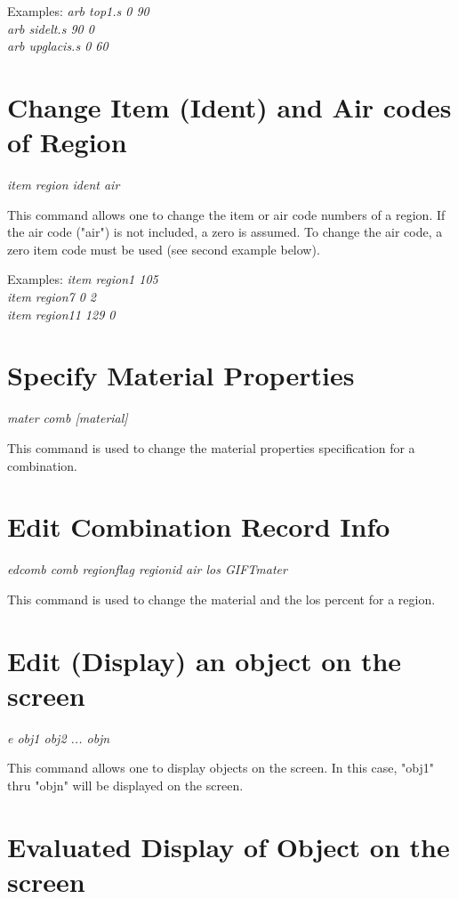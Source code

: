 Examples:
{\em
           arb top1.s 0 90 \\
           arb sidelt.s 90 0 \\
           arb upglacis.s 0 60 \\
}

\section{Change Item (Ident) and Air codes of Region}

{\em \center
item region ident air
}

This command allows one to change the item or
air code numbers of a region.  If the air code ("air") is not included,
a zero is assumed.
To change the air code, a zero item code must be used (see second
example below).

Examples:
{\em
            item region1 105 \\
            item region7 0 2 \\
            item region11 129 0 \\
}

\section{Specify Material Properties}

{\em \center
mater comb [material]
}

This command is used to change the material properties specification for
a combination.

\section{Edit Combination Record Info}

{\em \center
edcomb comb regionflag regionid air los GIFTmater
}

This command is used to change the material and the los percent for
a region.

\section{Edit (Display) an object on the screen}

{\em \center
e obj1 obj2 ... objn
}

This command allows one to display objects on the screen.
In this case, "obj1" thru "objn" will be displayed on the screen.

\section{Evaluated Display of Object on the screen}

